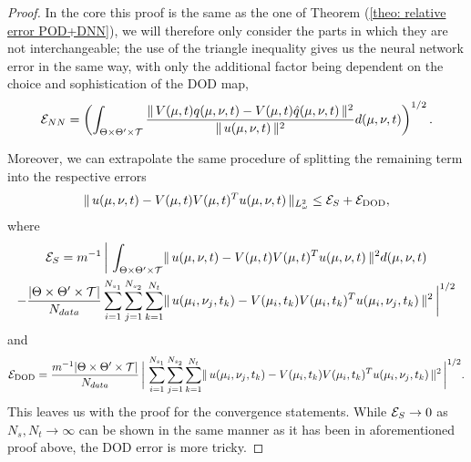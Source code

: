 \begin{proof}
    
    In the core this proof is the same as the one of Theorem (\ref{theo: relative error POD+DNN}), we will therefore only consider the parts in which they are not interchangeable; the use of the triangle inequality gives us the neural network error in the same way, with only the additional factor being dependent on the choice and sophistication of the DOD map, 
    \begin{equation}
        \mathcal{E}_{NN} = \left( \int_{\Theta \times \Theta' \times \mathcal{T}} \frac{\lVert \, V(\mu, t) q (\mu, \nu, t) - V(\mu, t) \hat{q}(\mu, \nu, t) \, \rVert^2}{\lVert \, u(\mu, \nu, t) \, \rVert^2} d(\mu, \nu, t) \right)^{1/2}.
    \end{equation}
    
    Moreover, we can extrapolate the same procedure of splitting the remaining term into the respective errors
    \begin{equation}
        \lVert \, u(\mu, \nu, t) - V(\mu, t) V(\mu, t)^T u(\mu, \nu, t) \, \rVert_{L^2_\omega} \leq \mathcal{E}_S + \mathcal{E}_{\text{DOD}},
    \end{equation}
    where
    \begin{multline*}
        \mathcal{E}_S = m^{-1} \, \bigg\vert \, \int_{\Theta \times \Theta' \times \mathcal{T}} \lVert \, u(\mu, \nu, t) - V(\mu, t) V(\mu, t)^T u(\mu, \nu, t) \, \rVert^2 d(\mu, \nu, t) \\
        - \frac{\vert \Theta \times \Theta' \times \mathcal{T} \vert}{N_{data}} \sum_{i = 1}^{N_{s_1}} \sum_{j = 1}^{N_{s_2}} \sum_{k = 1}^{N_t} \lVert \, u(\mu_i, \nu_j, t_k) - V(\mu_i, t_k) V(\mu_i, t_k)^T u(\mu_i, \nu_j, t_k) \, \rVert^2 \, \bigg\vert^{1/2}
    \end{multline*}
    and
    \begin{equation*}
        \mathcal{E}_{\text{DOD}} = \frac{m^{-1} \vert \Theta \times \Theta' \times \mathcal{T} \vert}{N_{data}} \, \bigg\vert \,  
        \sum_{i = 1}^{N_{s_1}} \sum_{j = 1}^{N_{s_2}} \sum_{k = 1}^{N_t} 
        \lVert \, u(\mu_i, \nu_j, t_k) - V(\mu_i, t_k) V(\mu_i, t_k)^T u(\mu_i, \nu_j, t_k) \, \rVert^2 \, \bigg\vert^{1/2}.
    \end{equation*}
    This leaves us with the proof for the convergence statements. While $\mathcal{E}_S \to 0$ as $N_s, N_t \to \infty$ can be shown in the same manner as it has been in aforementioned proof above, the DOD error is more tricky. 
    

\end{proof}

